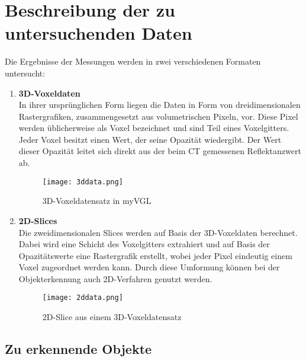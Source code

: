 
\chapter{Beschreibung der zu untersuchenden Daten}
Die Ergebnisse der Messungen werden in zwei verschiedenen Formaten untersucht:

\begin{enumerate}
\item \textbf{3D-Voxeldaten} \\
In ihrer ursprünglichen Form liegen die Daten in Form von dreidimensionalen Rastergrafiken, zusammengesetzt aus volumetrischen Pixeln, vor. Diese Pixel werden üblicherweise als Voxel bezeichnet und sind Teil eines Voxelgitters. Jeder Voxel besitzt einen Wert, der seine Opazität wiedergibt. Der Wert dieser Opazität leitet sich direkt aus der beim CT gemessenen Reflektanzwert ab.

\begin{figure}[H]
  \begin{center}
    \texttt{[image: 3ddata.png]}
    \caption{3D-Voxeldatensatz in myVGL}
    \label{fig:3ddata1}
  \end{center}
\end{figure}
\newpage
\item \textbf{2D-Slices} \\
Die zweidimensionalen Slices werden auf Basis der 3D-Voxeldaten berechnet. Dabei wird eine Schicht des Voxelgitters extrahiert und auf Basis der Opazitätswerte eine Rastergrafik erstellt, wobei jeder Pixel eindeutig einem Voxel zugeordnet werden kann. Durch diese Umformung können bei der Objekterkennung auch 2D-Verfahren genutzt werden.

\begin{figure}[H]
  \begin{center}
    \texttt{[image: 2ddata.png]}
    \caption{2D-Slice aus einem 3D-Voxeldatensatz}
    \label{fig:2ddata1}
  \end{center}
\end{figure}
\end{enumerate}

\section{Zu erkennende Objekte}

